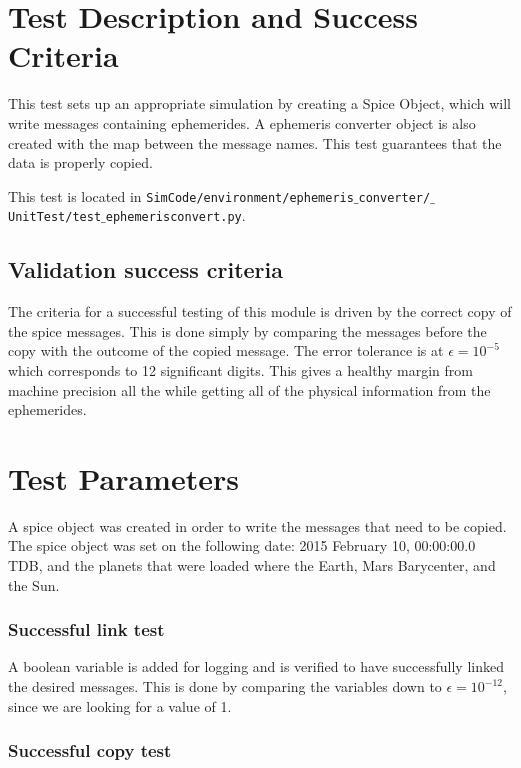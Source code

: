 \section{Test Description and Success Criteria}

This test sets up an appropriate simulation by creating a Spice Object, which will write messages containing ephemerides. A ephemeris converter object is also created with the map between the message names. This test guarantees that the data is properly copied.

This test is located in {\tt SimCode/environment/ephemeris$\_$converter/$\_$UnitTest/test$\_$ephemerisconvert.py}. \par

\subsection{Validation success criteria }

The criteria for a successful testing of this module is driven by the correct copy of the spice messages. This is done simply by comparing the messages before the copy with the outcome of the copied message. The error tolerance is at $\epsilon =10^{-5}$ which corresponds to 12 significant digits. This gives a healthy margin from machine precision all the while getting all of the physical information from the ephemerides. 

\section{Test Parameters}

A spice object was created in order to write the messages that need to be copied.
The spice object was set on the following date: 2015 February 10, 00:00:00.0 TDB, and the planets that were loaded where the Earth, Mars Barycenter, and the Sun.

\subsubsection*{Successful link test}

A boolean variable is added for logging and is verified to have successfully linked the desired messages. This is done by comparing the variables down to $\epsilon =10^{-12}$, since we are looking for a value of 1.

\subsubsection*{Successful copy test}

